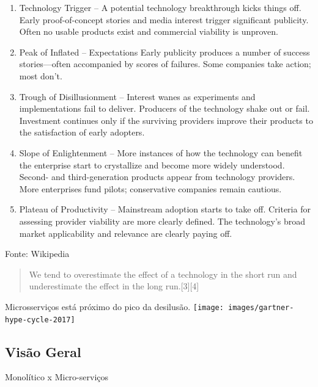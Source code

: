 \begin{frame}
\begin{scriptsize}
\begin{enumerate}
\item Technology Trigger -- A potential technology breakthrough kicks things off. Early proof-of-concept stories and media interest trigger significant publicity. Often no usable products exist and commercial viability is unproven.
\item Peak of Inflated -- Expectations	Early publicity produces a number of success stories—often accompanied by scores of failures. Some companies take action; most don't.
\item Trough of Disillusionment	-- Interest wanes as experiments and implementations fail to deliver. Producers of the technology shake out or fail. Investment continues only if the surviving providers improve their products to the satisfaction of early adopters.
\item  Slope of Enlightenment -- More instances of how the technology can benefit the enterprise start to crystallize and become more widely understood. Second- and third-generation products appear from technology providers. More enterprises fund pilots; conservative companies remain cautious.
\item Plateau of Productivity -- Mainstream adoption starts to take off. Criteria for assessing provider viability are more clearly defined. The technology's broad market applicability and relevance are clearly paying off.
\end{enumerate}
\end{scriptsize}
Fonte: Wikipedia
\end{frame}

\begin{frame}
\begin{quotation}
	We tend to overestimate the effect of a technology in the short run and underestimate the effect in the long run.[3][4]
\end{quotation}	
\end{frame}

\begin{frame}
Microsserviços está próximo do pico da desilusão.
\texttt{[image: images/gartner-hype-cycle-2017]}
\end{frame}


\subsection{Visão Geral}
\begin{frame}
Monolítico x Micro-serviços
\end{frame}

